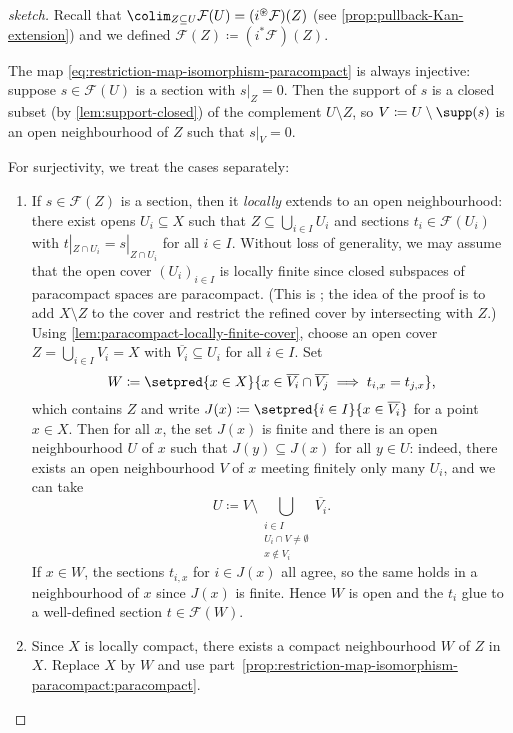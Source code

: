 \begin{proof}[sketch]
Recall that \(\colim_{Z\subseteq U}\mathcal F(U)=(i^\circledast\mathcal F)(Z)\) (see \cref{prop:pullback-Kan-extension}) and we defined \(\mathcal F(Z)\coloneq(i^*\mathcal F)(Z)\).

The map \cref{eq:restriction-map-isomorphism-paracompact} is always injective: suppose \(s\in\mathcal F(U)\) is a section with \(s|_Z=0\).
Then the support of \(s\) is a closed subset (by \cref{lem:support-closed}) of the complement \(U\setminus Z\), so \(V\coloneq U\setminus\supp(s)\) is an open neighbourhood of \(Z\) such that \(s|_V=0\).

For surjectivity, we treat the cases separately:
\begin{enumerate}
\item
  If \(s\in\mathcal F(Z)\) is a section, then it \emph{locally} extends to an open neighbourhood: there exist opens \(U_i\subseteq X\) such that \(Z\subseteq\bigcup_{i\in I}U_i\) and sections \(t_i\in\mathcal F(U_i)\) with \(t|_{Z\cap U_i}=s|_{Z\cap U_i}\) for all \(i\in I\).
  Without loss of generality, we may assume that the open cover \((U_i)_{i\in I}\) is locally finite since closed subspaces of paracompact spaces are paracompact.
  (This is \cite[Theorem~41.2]{MunkresTopology}; the idea of the proof is to add \(X\setminus Z\) to the cover and restrict the refined cover by intersecting with \(Z\).)
  Using \cref{lem:paracompact-locally-finite-cover}, choose an open cover \(Z=\bigcup_{i\in I}V_i=X\) with \(\overline{V_i}\subseteq U_i\) for all \(i\in I\).
  Set
  \[ W\coloneq\setpred{x\in X}{x\in\overline{V_i}\cap\overline{V_j}\implies t_{i,x}=t_{j,x}}\text{,} \]
  which contains \(Z\) and write \(J(x)\coloneq\setpred{i\in I}{x\in\overline{V_i}}\) for a point \(x\in X\).
  Then for all \(x\), the set \(J(x)\) is finite and there is an open neighbourhood \(U\) of \(x\) such that \(J(y)\subseteq J(x)\) for all \(y\in U\): indeed, there exists an open neighbourhood \(V\) of \(x\) meeting finitely only many \(U_i\), and we can take
  \[ U\coloneq V\setminus\bigcup_{\substack{i\in I \\ U_i\cap V\neq\emptyset \\ x\notin V_i}}\overline{V_i}\text{.} \]
  If \(x\in W\), the sections \(t_{i,x}\) for \(i\in J(x)\) all agree, so the same holds in a neighbourhood of \(x\) since \(J(x)\) is finite.
  Hence \(W\) is open and the \(t_i\) glue to a well-defined section \(t\in\mathcal F(W)\).
\item
  Since \(X\) is locally compact, there exists a compact neighbourhood \(W\) of \(Z\) in \(X\).
  Replace \(X\) by \(W\) and use part~\cref{prop:restriction-map-isomorphism-paracompact:paracompact}.
  \qedhere
\end{enumerate}
\end{proof}

